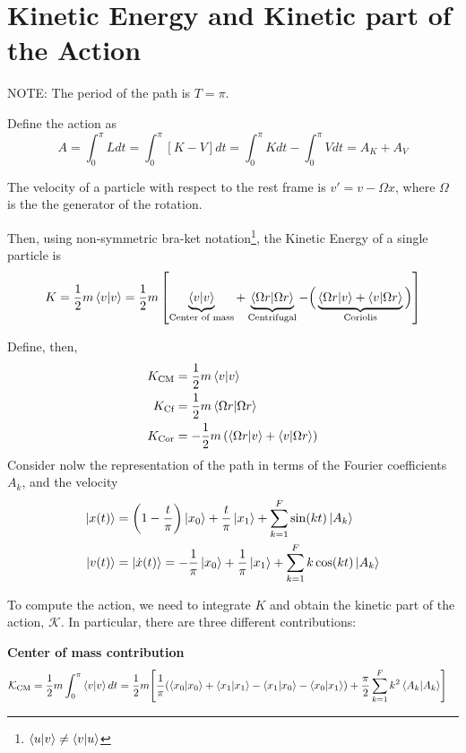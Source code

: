 \documentclass[a4paper, 12pt]{article}
\begin{document}
\section{Kinetic Energy and Kinetic part of the Action}
NOTE: The period of the path is $T = \pi$.

Define the action as
$$ A = \int_0^\pi L dt = \int_0^\pi \left[ K - V \right] dt = \int_0^\pi K dt - \int_0^\pi V dt = A_K + A_V $$

The velocity of a particle with respect to the rest frame is $v' =  v - \Omega x$, where $\Omega$ is the the generator of the rotation.

Then, using non-symmetric bra-ket notation\footnote{$\braket{u}{v} \neq \braket{v}{u}$}, the Kinetic Energy of a single particle is
\[ K = \frac 1 2m \braket{v} = \frac 1 2  m \left[ \underbrace{\braket{v}}_\text{Center of mass} + \underbrace{\braket{\Omega r}}_\text{Centrifugal} - \Big(\underbrace{\braket{\Omega r}{v} + \braket{v}{\Omega r}}_\text{Coriolis}\Big)\right]\]


Define, then,
\begin{align*}
    K_\text{CM} &= \frac 1 2 m \braket{v} \\
    K_\text{Cf} &= \frac 1 2 m \braket{\Omega r} \\
    K_\text{Cor} &= -\frac 1 2 m \left(\braket{\Omega r}{v} + \braket{v}{\Omega r}\right)
\end{align*}
Consider nolw the representation of the path in terms of the Fourier coefficients $A_k$, and the velocity
\begin{align*}
    \ket{x(t)} &=\qty(1-\frac t \pi)\ket{x_0} + \frac t \pi \ket{x_1} + \sum_{k=1}^F \sin(kt) \ket{A_k}   \\
    \ket{v(t)} &= \ket{\dot x(t)} = -\frac 1 \pi \ket{x_0} + \frac 1 \pi \ket{x_1} + \sum_{k=1}^F k  \cos(kt) \ket{A_k}
\end{align*}

To compute the action, we need to integrate $K$ and obtain the kinetic part of the action, $\mathcal K$. In particular, there are three different contributions:
\vspace{0.5cm}

\textbf{Center of mass contribution}
   \begin{align*}
    \mathcal K_\text{CM} &= \frac 1 2 m\int_0^\pi \braket{v} dt=\frac 1 2 m \qty[\frac 1 \pi\qty(\braket{x_0} +\braket{x_1} - \braket{x_1}{x_0} - \braket{x_0}{x_1}) + \frac \pi 2 \sum_{k=1}^F k^2\braket{A_k}{A_k}]
   \end{align*}
   \vspace{0.5cm}
\end{document}
